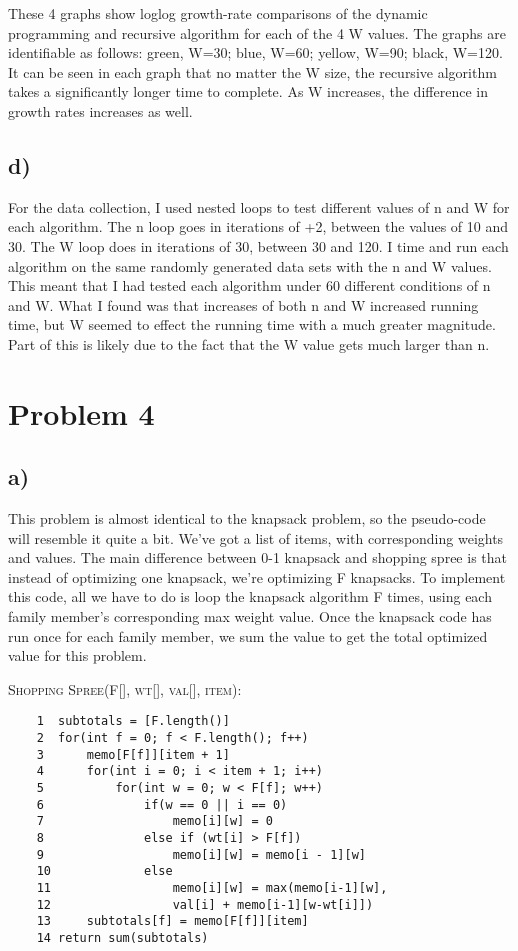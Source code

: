 \documentclass{article}
\begin{document}
These 4 graphs show loglog growth-rate comparisons of the dynamic programming and recursive algorithm for each of the 4 W values. The graphs are identifiable as follows: green, W=30; blue, W=60; yellow, W=90; black, W=120.  It can be seen in each graph that no matter the W size, the recursive algorithm takes a significantly longer time to complete.  As W increases, the difference in growth rates increases as well.

\subsection*{d)}

For the data collection, I used nested loops to test different values of n and W for each algorithm.  The n loop goes in iterations of +2, between the values of 10 and 30.  The W loop does in iterations of 30, between 30 and 120.  I time and run each algorithm on the same randomly generated data sets with the n and W values.  This meant that I had tested each algorithm under 60 different conditions of n and W.  What I found was that increases of both n and W increased running time, but W seemed to effect the running time with a much greater magnitude.  Part of this is likely due to the fact that the W value gets much larger than n.  

\section*{Problem 4}

\subsection*{a)}

This problem is almost identical to the knapsack problem, so the pseudo-code will resemble it quite a bit.  We've got a list of items, with corresponding weights and values.  The main difference between 0-1 knapsack and shopping spree is that instead of optimizing one knapsack, we're optimizing F knapsacks.  To implement this code, all we have to do is loop the knapsack algorithm F times, using each family member's corresponding max weight value.  Once the knapsack code has run once for each family member, we sum the value to get the total optimized value for this problem.

\textsc{Shopping Spree(F[], wt[], val[], item):}
    
\begin{verbatim}
    1  subtotals = [F.length()]
    2  for(int f = 0; f < F.length(); f++)
    3      memo[F[f]][item + 1]
    4      for(int i = 0; i < item + 1; i++)
    5          for(int w = 0; w < F[f]; w++)
    6              if(w == 0 || i == 0)
    7                  memo[i][w] = 0
    8              else if (wt[i] > F[f])
    9                  memo[i][w] = memo[i - 1][w]
    10             else
    11                 memo[i][w] = max(memo[i-1][w],
    12                 val[i] + memo[i-1][w-wt[i]])
    13     subtotals[f] = memo[F[f]][item]
    14 return sum(subtotals)
                    
\end{verbatim}
\end{document}
